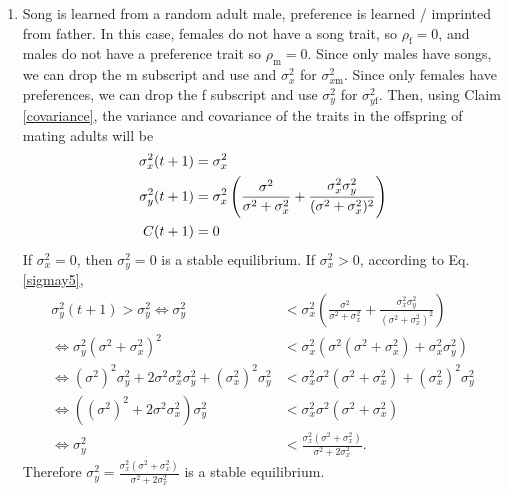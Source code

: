 \documentclass{article}
\newcommand{\x}[1]{\text{#1}}
\begin{document}
\begin{enumerate}
\item Song is learned from a random adult male, preference is learned / imprinted from father. 
In this case, females do not have a song trait, so $\rho_\x{f}=0$, and males do not have a preference trait so $\rho_\x{m}=0$. Since only males have songs, we can drop the m subscript and use and $\sigma_x^2$ for $\sigma_{x\x{m}}^2$. Since only females have preferences, we can drop the f subscript and use $\sigma_y^2$ for $\sigma_{y\x{f}}^2$. Then, using Claim \ref{covariance}, the variance and covariance of the traits in the offspring of mating adults will be 
\begin{align}
\sigma_x^2(t+1)&=\sigma_x^2 \notag %
\\ \sigma_y^2(t+1)&=\sigma_x^2\left(\frac{\sigma^2}{\sigma^2+\sigma_x^2}+\frac{\sigma_x^2\sigma_y^2}{(\sigma^2+\sigma_x^2)^2}\right) \label{sigmay5}
\\ C(t+1)&=0 \notag
\end{align}
If $\sigma_x^2=0$, then $\sigma_y^2=0$ is a stable equilibrium. If $\sigma_x^2>0$, according to Eq. \ref{sigmay5}, 
\begin{align*}
\sigma_y^2(t+1)>\sigma_y^2 \Leftrightarrow \sigma_y^2&<\sigma_x^2\left(\frac{\sigma^2}{\sigma^2+\sigma_x^2}+\frac{\sigma_x^2\sigma_y^2}{(\sigma^2+\sigma_x^2)^2}\right)
\\ \Leftrightarrow \sigma_y^2(\sigma^2+\sigma_x^2)^2&<\sigma_x^2(\sigma^2(\sigma^2+\sigma_x^2)+\sigma_x^2\sigma_y^2)
\\\Leftrightarrow (\sigma^2)^2\sigma_y^2+2\sigma^2\sigma_x^2\sigma_y^2+(\sigma_x^2)^2\sigma_y^2&<\sigma_x^2\sigma^2(\sigma^2+\sigma_x^2)+(\sigma_x^2)^2\sigma_y^2
\\ \Leftrightarrow ((\sigma^2)^2+2\sigma^2\sigma_x^2)\sigma_y^2&<\sigma_x^2\sigma^2(\sigma^2+\sigma_x^2)
\\ \Leftrightarrow \sigma_y^2&<\frac{\sigma_x^2(\sigma^2+\sigma_x^2)}{\sigma^2+2\sigma_x^2}.
\end{align*}
Therefore $\sigma_y^2=\frac{\sigma_x^2(\sigma^2+\sigma_x^2)}{\sigma^2+2\sigma_x^2}$ is a stable equilibrium.




\end{enumerate}
\end{document}
